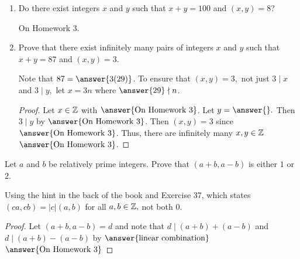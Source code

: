 \documentclass{../ximera}
\begin{document}
\begin{br}
    \begin{enumerate}[label=(\alph*)] %
        \item Do there exist integers $x$ and $y$ such that $x + y = 100$ and $(x, y) = 8$?
        
        
        \begin{solution}
            On Homework 3.
        \end{solution}
 
        \item Prove that there exist infinitely many pairs of integers $x$ and $y$ such that $x + y = 87$ and $(x, y) = 3$.
 
        \begin{scratch}
         Note that $87=\answer{3(29)}$.
         To ensure that $(x,y)=3,$ not just $3\mid x$ and $3\mid y,$ let $x=3n$ where $\answer{29}\nmid n$.
        
        \end{scratch}
 
        \begin{proof}
         
         Let $x\in\mathbb Z$ with $\answer{\textnormal{On Homework 3}}$. Let $y= \answer{}.$ Then $3\mid y$ by  $\answer{\textnormal{On Homework 3}}$. Then $(x,y)=3$ since $\answer{\textnormal{On Homework 3}}$. Thus, there are infinitely many $x,y\in\mathbb Z$ $\answer{\textnormal{On Homework 3}}$.
         
        \end{proof}
    
    \end{enumerate}
\end{br}



\begin{br} Let $a$ and $b$ be relatively prime integers. Prove that $(a+b,a-b)$ is either $1$ or $2$.
	

    Using the hint in the back of the book and Exercise 37, which states $(ca,cb)=|c|(a,b)$ for all $a,b\in\mathbb Z,$ not both $0.$ 
\begin{proof}
	Let $(a+b,a-b)=d$ and note that $d\mid (a+b)+(a-b)$ and $d\mid (a+b)-(a-b)$ by $\answer{\textnormal{linear combination}}$
    $\answer{\textnormal{On Homework 3}}$
\end{proof}
\end{br}
\end{document}
